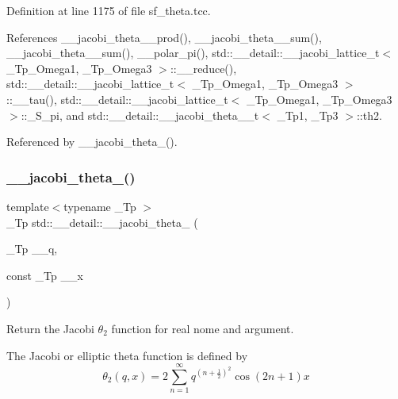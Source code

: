Definition at line 1175 of file sf\+\_\+theta.\+tcc.



References \+\_\+\+\_\+jacobi\+\_\+theta\+\_\+\_\+prod(), \+\_\+\+\_\+jacobi\+\_\+theta\+\_\+\_\+sum(), \+\_\+\+\_\+jacobi\+\_\+theta\+\_\+\_\+sum(), \+\_\+\+\_\+polar\+\_\+pi(), std\+::\+\_\+\+\_\+detail\+::\+\_\+\+\_\+jacobi\+\_\+lattice\+\_\+t$<$ \+\_\+\+Tp\+\_\+\+Omega1, \+\_\+\+Tp\+\_\+\+Omega3 $>$\+::\+\_\+\+\_\+reduce(), std\+::\+\_\+\+\_\+detail\+::\+\_\+\+\_\+jacobi\+\_\+lattice\+\_\+t$<$ \+\_\+\+Tp\+\_\+\+Omega1, \+\_\+\+Tp\+\_\+\+Omega3 $>$\+::\+\_\+\+\_\+tau(), std\+::\+\_\+\+\_\+detail\+::\+\_\+\+\_\+jacobi\+\_\+lattice\+\_\+t$<$ \+\_\+\+Tp\+\_\+\+Omega1, \+\_\+\+Tp\+\_\+\+Omega3 $>$\+::\+\_\+\+S\+\_\+pi, and std\+::\+\_\+\+\_\+detail\+::\+\_\+\+\_\+jacobi\+\_\+theta\+\_\+\_\+t$<$ \+\_\+\+Tp1, \+\_\+\+Tp3 $>$\+::th2.



Referenced by \+\_\+\+\_\+jacobi\+\_\+theta\+\_().

\mbox{\label{namespacestd_1_1____detail_a5aace3bea7c88443d5bceb503a0452d0}} 
\subsubsection{\texorpdfstring{\+\_\+\+\_\+jacobi\+\_\+theta\+\_()}{\_\_jacobi\_theta\_2()}\hspace{0.1cm}{\footnotesize\ttfamily [2/2]}}
{\footnotesize\ttfamily template$<$typename \+\_\+\+Tp $>$ \\
\+\_\+\+Tp std\+::\+\_\+\+\_\+detail\+::\+\_\+\+\_\+jacobi\+\_\+theta\+\_ (\begin{DoxyParamCaption}\item[{\+\_\+\+Tp}]{\+\_\+\+\_\+q,  }\item[{const \+\_\+\+Tp}]{\+\_\+\+\_\+x }\end{DoxyParamCaption})}

Return the Jacobi $ \theta_2 $ function for real nome and argument.

The Jacobi or elliptic theta function is defined by \[ \theta_2(q,x) = 2\sum_{n=1}^{\infty} q^{(n+\frac{1}{2})^2}\cos{(2n+1)x} \]


